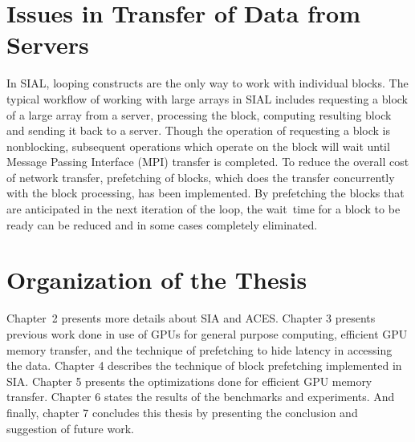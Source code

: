 \section{Issues in Transfer of Data from Servers}
In SIAL, looping constructs are the only way to work with individual blocks.
The typical workflow of working with large arrays in SIAL includes requesting a
block of a large array from a server,
processing the block, computing resulting block and sending it back to a server. Though
the operation of requesting a block is nonblocking, subsequent operations
which operate on the block will wait until Message Passing Interface (MPI)
transfer is completed. To reduce the overall cost of network
transfer, prefetching of blocks, which does the transfer concurrently
with the block processing, has been implemented. By prefetching the blocks that are anticipated in
the next iteration of the loop, the wait~time for a block to be ready
can be reduced and in some cases completely eliminated.

\section{Organization of the Thesis}
Chapter~2 presents more details about SIA and ACES. Chapter 3 presents previous work done in use of GPUs for general purpose
computing, efficient GPU memory transfer, and the technique of prefetching to hide
latency in accessing the data.
Chapter 4 describes the technique of block prefetching implemented in SIA. Chapter 5
presents the optimizations done for efficient GPU memory transfer. Chapter 6 states the
results of the benchmarks and experiments. And
finally, chapter 7 concludes this thesis by presenting the conclusion and suggestion
of future work.

